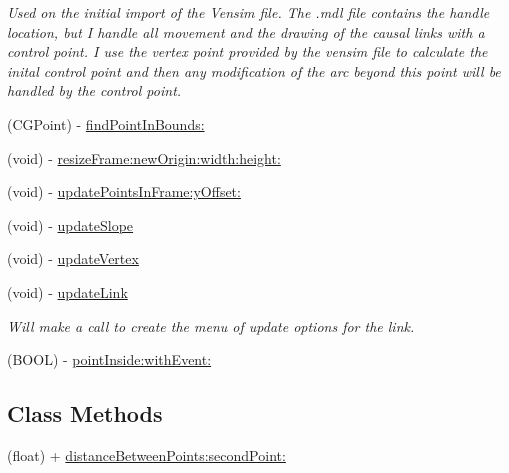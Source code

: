 \begin{DoxyCompactItemize}
\begin{DoxyCompactList}\small\item\em Used on the initial import of the Vensim file. The .mdl file contains the handle location, but I handle all movement and the drawing of the causal links with a control point. I use the vertex point provided by the vensim file to calculate the inital control point and then any modification of the arc beyond this point will be handled by the control point. \end{DoxyCompactList}\item 
(C\-G\-Point) -\/ \hyperlink{interface_causal_link_view_afdedd2313a21ff2514c8f7c975e03f06}{find\-Point\-In\-Bounds\-:}
\item 
(void) -\/ \hyperlink{interface_causal_link_view_a339bfeabcfc5f19a0da1c941a6f70c8c}{resize\-Frame\-:new\-Origin\-:width\-:height\-:}
\item 
(void) -\/ \hyperlink{interface_causal_link_view_ace06597f5de275e1bb2a4d2d5b978e1f}{update\-Points\-In\-Frame\-:y\-Offset\-:}
\item 
(void) -\/ \hyperlink{interface_causal_link_view_a0d92c4b54808a5fa804ba5da408ec6a9}{update\-Slope}
\item 
(void) -\/ \hyperlink{interface_causal_link_view_a83f47d49615b69616f780c42780164c9}{update\-Vertex}
\item 
\hypertarget{interface_causal_link_view_a61a5c42146452337656a7abc21185686}{(void) -\/ \hyperlink{interface_causal_link_view_a61a5c42146452337656a7abc21185686}{update\-Link}}\label{interface_causal_link_view_a61a5c42146452337656a7abc21185686}

\begin{DoxyCompactList}\small\item\em Will make a call to create the menu of update options for the link. \end{DoxyCompactList}\item 
(B\-O\-O\-L) -\/ \hyperlink{interface_causal_link_view_af48e1d11b9394830d3c3b12a5f84ba61}{point\-Inside\-:with\-Event\-:}
\end{DoxyCompactItemize}
\subsection*{Class Methods}
\begin{DoxyCompactItemize}
\item 
(float) + \hyperlink{interface_causal_link_view_a23aef4b7c8b351589ca8e20f2a702bd0}{distance\-Between\-Points\-:second\-Point\-:}
\end{DoxyCompactItemize}

